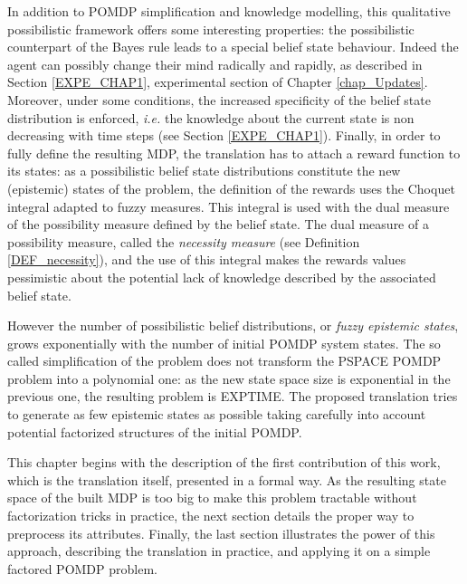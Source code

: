 In addition to POMDP simplification and knowledge modelling, this qualitative
possibilistic framework offers some interesting properties: the possibilistic counterpart 
of the Bayes rule leads to a special belief state behaviour. Indeed the 
agent can possibly change their mind radically and rapidly, 
as described in Section \ref{EXPE_CHAP1}, 
experimental section of Chapter \ref{chap_Updates}.%
Moreover, under some conditions, the increased specificity of the belief state distribution is enforced, \textit{i.e.} 
the knowledge about the current state is non decreasing with time steps (see Section \ref{EXPE_CHAP1}).
Finally, in order to fully define the resulting MDP, the translation has to attach 
a reward function to its states: as a possibilistic belief state distributions 
constitute the new (epistemic) states of the problem, the definition of the rewards
uses the Choquet integral adapted to fuzzy measures. 
This integral is used with the dual measure of the possibility measure defined by the belief state. 
The dual measure of a possibility measure, called the \textit{necessity measure} (see Definition \ref{DEF_necessity}), 
and the use of this integral makes the rewards values pessimistic about the potential lack of knowledge
described by the associated belief state.

However the number of possibilistic belief distributions, or \textit{fuzzy epistemic states},
grows exponentially with the number of initial POMDP system states. 
The so called simplification of the problem does not transform the PSPACE POMDP 
problem into a polynomial one: as the new state space size is exponential in the 
previous one, the resulting problem is EXPTIME. The proposed translation 
tries to generate as few epistemic states as possible taking carefully into account
potential factorized structures of the initial POMDP.

This chapter begins with the description of 
the first contribution of this work, which is the translation itself, 
presented in a formal way.
As the resulting state space of the built MDP is too big to make this problem
tractable without factorization tricks in practice,
the next section details the proper way to preprocess its attributes.
Finally, the last section illustrates the power of this approach,
describing the translation in practice, 
and applying it on a simple factored POMDP problem.

